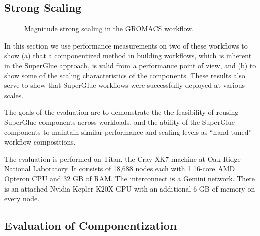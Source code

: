 \subsection{Strong Scaling}
\begin{figure}
  \centering
  
  \caption{Magnitude strong scaling in the GROMACS workflow.}
  \label{fig:gtcp-strong}
  \vspace{-0.25in}
\end{figure}



In this section we use
performance measurements on two of these workflows
to show (a) that a componentized method in
building workflows, which is inherent in the SuperGlue approach,
is valid from a performance point of view,
and (b) to show some of the scaling characteristics
of the components.
These results also serve to show that
SuperGlue workflows were successfully
deployed at various
scales.

The goals of the evaluation are to demonstrate the  the feasibility of reusing
  SuperGlue components across workloads, and the ability of the
  SuperGlue components to maintain similar performance and scaling
levels as ``hand-tuned'' workflow compositions. 
\fi

The evaluation is performed on Titan, the Cray XK7 machine at Oak Ridge
National Laboratory. It consists of 18,688 nodes each with 1 16-core AMD
Opteron CPU and 32 GB of RAM. The interconnect is a Gemini network. There is an
attached Nvidia Kepler K20X GPU with an additional 6 GB of memory on every
node.

\subsection{Evaluation of Componentization}

